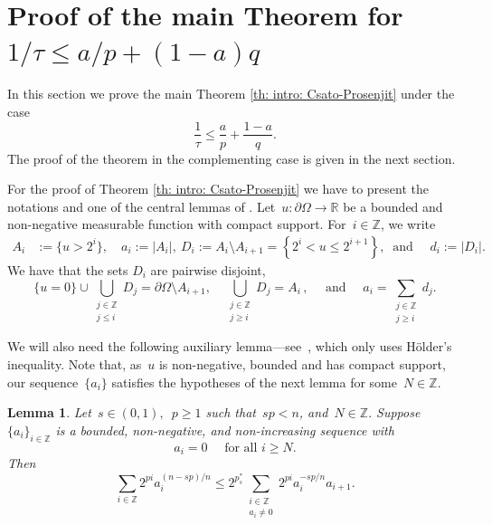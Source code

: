 \documentclass[reqno,12pt]{amsart}
\newcommand{\R}{\mathbb{R}}
\newcommand{\Z}{\mathbb{Z}}
\newcommand{\delomega}{\partial\Omega}
\numberwithin{equation}{section}
\theoremstyle{plain}
\newtheorem{lemma}[definition]{Lemma}
\theoremstyle{definition}
\renewcommand{\leq}{\leqslant}
\renewcommand{\geq}{\geqslant}
\begin{document}




\section{Proof of the main Theorem for $1/\tau\leq a/p+(1-a)q$}
\label{section:proof of tau bigger p}

In this section we prove the main Theorem \ref{th: intro: Csato-Prosenjit} under the case
\begin{equation}
 \label{eq:assumption case 1}
  \frac{1}{\tau}\leq \frac{a}{p}+\frac{1-a}{q}.
\end{equation}
The proof of the theorem in the complementing case is given in the next section. 
 
  





For the proof of Theorem \ref{th: intro: Csato-Prosenjit}
we have to present the notations and one of the central lemmas of \cite{Cabre-Cozzi-Csato}.
Let~${u}:{\delomega}\to \R$ be a bounded and non-negative measurable function with compact support. For~$i \in \Z$, we write
\begin{align*}
  A_i & :=\{{u}> 2^i\},\quad a_i:=|A_i|, \  D_i := A_i\setminus A_{i+1}=\left\{ 2^i< {u}\leq 2^{i+1}\right\}, \ \text{ and }\quad d_i:=|D_i|.
\end{align*}
We have that the sets $D_i$ are pairwise disjoint,
$$
  \{ u = 0\} \cup \bigcup_{\substack{ j\in \mathbb{Z}\\j\leq i}}D_j= \partial \Omega \setminus A_{i+1},\quad
  \bigcup_{\substack{ j\in\mathbb{Z}\\ j\geq i}} D_j=A_i\,,\quad\text{ and }\quad 
  a_i=\sum_{\substack{j\in \mathbb{Z}\\ j\geq i}} d_j.
$$


We will also need the following auxiliary lemma---see~\cite[Lemma 6.2]{HitchhikersG},
 which  only uses H\"older's inequality.
Note that, as~$u$ is non-negative, bounded and has compact support, our sequence~$\{ a_i \}$ satisfies the hypotheses of the next lemma for some~$N\in\mathbb{Z}.$


\begin{lemma}
\label{lemma:ineq of sums ak and akplus1}
Let~$s\in (0,1),$~$p\geq 1$ such that~$s p<n$, and~$N\in\mathbb{Z}.$ Suppose~$\{ a_i \}_{i \in \Z}$ is a bounded, non-negative, and non-increasing sequence with 
$$
  a_i=0\quad\text{ for all~$i\geq N$}.
$$
Then
\begin{equation}\label{eq: sec3: inequality involving series}
     \sum_{i\in \mathbb{Z}} 2^{pi} a_i^{(n-s p)/n} \leq 2^{p^{\ast}_s}\sum_{\substack {i\in\mathbb{Z} \\ a_i\neq 0}}2^{pi}a_i^{-s p/n}a_{i+1}.
\end{equation}
\end{lemma}
\end{document}
